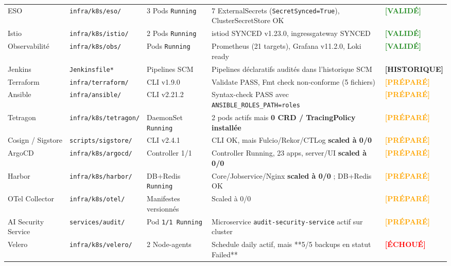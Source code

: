 \begin{table}[H]
\begin{tabular}{@{}p{2.6cm}p{2.2cm}p{2.2cm}p{4.8cm}p{2.0cm}@{}}
ESO & \texttt{infra/k8s/eso/} & 3 Pods \texttt{Running} & 7 ExternalSecrets (\texttt{SecretSynced=True}), ClusterSecretStore OK & \textcolor{ForestGreen}{\textbf{[VALIDÉ]}} \\
Istio & \texttt{infra/k8s/istio/} & 2 Pods \texttt{Running} & istiod SYNCED v1.23.0, ingressgateway SYNCED & \textcolor{ForestGreen}{\textbf{[VALIDÉ]}} \\
Observabilité & \texttt{infra/k8s/obs/} & Pods \texttt{Running} & Prometheus (21 targets), Grafana v11.2.0, Loki ready & \textcolor{ForestGreen}{\textbf{[VALIDÉ]}} \\
\midrule
Jenkins & \texttt{Jenkinsfile*} & Pipelines SCM & Pipelines déclaratifs audités dans l'historique SCM & \textcolor{NavyBlue}{\textbf{[HISTORIQUE]}} \\
\midrule
Terraform & \texttt{infra/terraform/} & CLI v1.9.0 & Validate PASS, Fmt check non-conforme (5 fichiers) & \textcolor{orange}{\textbf{[PRÉPARÉ]}} \\
Ansible & \texttt{infra/ansible/} & CLI v2.21.2 & Syntax-check PASS avec \texttt{ANSIBLE\_ROLES\_PATH=roles} & \textcolor{orange}{\textbf{[PRÉPARÉ]}} \\
Tetragon & \texttt{infra/k8s/tetragon/} & DaemonSet \texttt{Running} & 2 pods actifs mais \textbf{0 CRD / TracingPolicy installée} & \textcolor{orange}{\textbf{[PRÉPARÉ]}} \\
Cosign / Sigstore & \texttt{scripts/sigstore/} & CLI v2.4.1 & CLI OK, mais Fulcio/Rekor/CTLog \textbf{scaled à 0/0} & \textcolor{orange}{\textbf{[PRÉPARÉ]}} \\
ArgoCD & \texttt{infra/k8s/argocd/} & Controller 1/1 & Controller Running, 23 apps, server/UI \textbf{scaled à 0/0} & \textcolor{orange}{\textbf{[PRÉPARÉ]}} \\
Harbor & \texttt{infra/k8s/harbor/} & DB+Redis \texttt{Running} & Core/Jobservice/Nginx \textbf{scaled à 0/0} ; DB+Redis OK & \textcolor{orange}{\textbf{[PRÉPARÉ]}} \\
OTel Collector & \texttt{infra/k8s/otel/} & Manifestes versionnés & Scaled à 0/0 & \textcolor{orange}{\textbf{[PRÉPARÉ]}} \\
AI Security Service & \texttt{services/audit/} & Pod \texttt{1/1 Running} & Microservice \texttt{audit-security-service} actif sur cluster & \textcolor{orange}{\textbf{[PRÉPARÉ]}} \\
\midrule
Velero & \texttt{infra/k8s/velero/} & 2 Node-agents & Schedule daily actif, mais **5/5 backups en statut Failed** & \textcolor{red}{\textbf{[ÉCHOUÉ]}} \\

\end{tabular}
\end{table}
